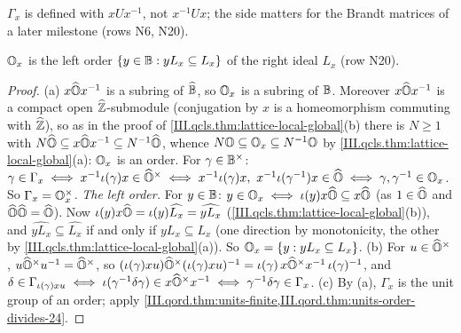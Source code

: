 \begin{definition}[stabilizers]
\end{definition}
\noindent $\Gamma_x$ is defined with $xUx^{-1}$, not $x^{-1}Ux$; the side matters for the Brandt matrices of a later milestone (rows N6, N20).

\begin{lemma}
\end{lemma}
\noindent $\mathbb{O}_x$ is the left order $\{y\in\mathbb{B}:yL_x\subseteq L_x\}$ of the right ideal $L_x$ (row N20).
\begin{proof}
(a) $x\widehat{\mathbb{O}} x^{-1}$ is a subring of $\widehat{\mathbb{B}}$, so $\mathbb{O}_x$ is a subring of $\mathbb{B}$. Moreover $x\widehat{\mathbb{O}} x^{-1}$ is a compact open $\widehat{\mathbb{Z}}$-submodule
(conjugation by $x$ is a homeomorphism commuting with $\widehat{\mathbb{Z}}$), so as in the proof of \cref{III.qcls.thm:lattice-local-global}(b) there is $N\ge1$ with
$N\widehat{\mathbb{O}}\subseteq x\widehat{\mathbb{O}} x^{-1}\subseteq N^{-1}\widehat{\mathbb{O}}$, whence $N\mathbb{O}\subseteq\mathbb{O}_x\subseteq N^{-1}\mathbb{O}$ by \cref{III.qcls.thm:lattice-local-global}(a): $\mathbb{O}_x$ is an order.
For $\gamma\in\mathbb{B}^\times$: $\gamma\in\Gamma_x\iff x^{-1}\iota(\gamma)x\in\Ohat^\times\iff x^{-1}\iota(\gamma)x,\ x^{-1}\iota(\gamma^{-1})x\in\Ohat\iff\gamma,\gamma^{-1}\in\Oord_x$.
So $\Gamma_x=\mathbb{O}_x^\times$.
\emph{The left order.} For $y\in\mathbb{B}$: $y\in\mathbb{O}_x\iff\iota(y)x\widehat{\mathbb{O}}\subseteq x\widehat{\mathbb{O}}$ (as $1\in\widehat{\mathbb{O}}$ and $\widehat{\mathbb{O}}\widehat{\mathbb{O}}=\widehat{\mathbb{O}}$). Now
$\iota(y)x\widehat{\mathbb{O}}=\iota(y)\widehat{L_x}=\widehat{yL_x}$ (\cref{III.qcls.thm:lattice-local-global}(b)), and $\widehat{yL_x}\subseteq\widehat{L_x}$ if and only if
$yL_x\subseteq L_x$ (one direction by monotonicity, the other by \cref{III.qcls.thm:lattice-local-global}(a)). So $\mathbb{O}_x=\{y:yL_x\subseteq L_x\}$.
(b) For $u\in\widehat{\mathbb{O}}^\times$, $u\widehat{\mathbb{O}}^\times u^{-1}=\widehat{\mathbb{O}}^\times$, so $(\iota(\gamma)xu)\widehat{\mathbb{O}}^\times(\iota(\gamma)xu)^{-1}=\iota(\gamma)\,x\widehat{\mathbb{O}}^\times x^{-1}\,\iota(\gamma)^{-1}$,
and $\delta\in\Gamma_{\iota(\gamma)xu}\iff\iota(\gamma^{-1}\delta\gamma)\in x\widehat{\mathbb{O}}^\times x^{-1}\iff\gamma^{-1}\delta\gamma\in\Gamma_x$.
(c) By (a), $\Gamma_x$ is the unit group of an order; apply \cref{III.qord.thm:units-finite,III.qord.thm:units-order-divides-24}.
\end{proof}

